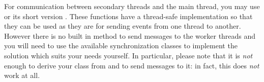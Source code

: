 For communication between secondary threads and the main thread, you may use 
or its short version . These functions
have a thread-safe implementation so that they can be used as they are for
sending events from one thread to another. However there is no built in method
to send messages to the worker threads and you will need to use the available
synchronization classes to implement the solution which suits your needs
yourself. In particular, please note that it is \emph{not} enough to derive
your class from  and 
 to send messages to it: in fact, this does
\emph{not} work at all.


